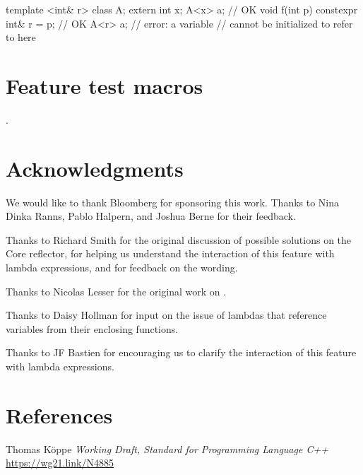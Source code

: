 \documentclass{wg21}
\begin{document}

\begin{addedblock}
\begin{example}
\begin{codeblock}
template <int& r> class A;
extern int x;
A<x> a;  // OK
void f(int p) {
    constexpr int& r = p;  // OK
    A<r> a;                // error: a  variable
                           // cannot be initialized to refer to  here
}
\end{codeblock}
\end{example}
\end{addedblock}

\section{Feature test macros}

.


\section{Acknowledgments}

We would like to thank Bloomberg for sponsoring this work.
Thanks to Nina Dinka Ranns, Pablo Halpern, and Joshua Berne for their feedback.

Thanks to Richard Smith for the original discussion of possible solutions on the Core reflector, for helping us understand the interaction of this feature with lambda expressions, and for feedback on the wording.

Thanks to Nicolas Lesser for the original work on .

Thanks to Daisy Hollman for input on the issue of lambdas that reference
variables from their enclosing functions.

Thanks to JF Bastien for encouraging us to clarify the interaction of this
feature with lambda expressions.

\section{References}

\renewcommand{\section}[2]{}%



\begin{thebibliography}{9}

Thomas Köppe
\emph{Working Draft, Standard for Programming Language C++}\newline
\url{https://wg21.link/N4885}


\end{thebibliography}
\end{document}

